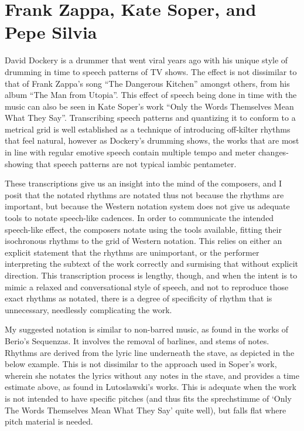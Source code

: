 
\section{Frank Zappa, Kate Soper, and Pepe Silvia}
David Dockery is a drummer that went viral years ago with his unique style of drumming in time to speech patterns of TV shows.\autocite[]{daviddockeryPepeSilviaDrums2017}
The effect is not dissimilar to that of Frank Zappa's song ``The Dangerous Kitchen'' amongst others, from his album ``The Man from Utopia''.
This effect of speech being done in time with the music can also be seen in Kate Soper's work ``Only the Words Themselves Mean What They Say''.
Transcribing speech patterns and quantizing it to conform to a metrical grid is well established as a technique of introducing off-kilter rhythms that feel natural, 
however as Dockery's drumming shows, the works that are most in line with regular emotive speech contain multiple tempo and meter changes- 
showing that speech patterns are not typical iambic pentameter.

These transcriptions give us an insight into the mind of the composers, and I posit that the notated rhythms are notated thus not because the rhythms are important, but because the Western notation system does not give us adequate tools to notate speech-like cadences. 
In order to communicate the intended speech-like effect, the composers notate using the tools available, fitting their isochronous rhythms to the grid of Western notation.
This relies on either an explicit statement that the rhythms are unimportant, or the performer interpreting the subtext of the work correctly and surmising that without explicit direction.
This transcription process is lengthy, though, and when the intent is to mimic a relaxed and conversational style of speech, and not to reproduce those exact rhythms as notated, there is a degree of specificity of rhythm that is unnecessary, needlessly complicating the work.

My suggested notation is similar to non-barred music, as found in the works of Berio's Sequenzas.
It involves the removal of barlines, and stems of notes. 
Rhythms are derived from the lyric line underneath the stave, as depicted in the below example.
This is not dissimilar to the approach used in Soper's work, wherein she notates the lyrics without any notes in the stave, and provides a time estimate above, as found in Lutoslawski's works.
This is adequate when the work is not intended to have specific pitches (and thus fits the sprechstimme of `Only The Words Themselves Mean What They Say' quite well), but falls flat where pitch material is needed.


